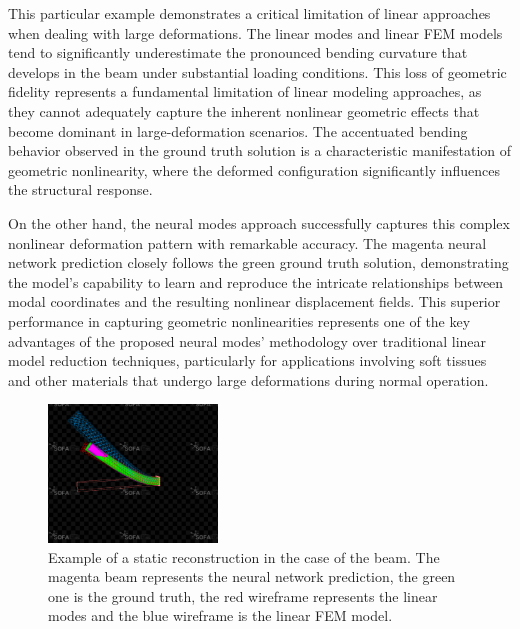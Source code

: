 This particular example demonstrates a critical limitation of linear approaches when dealing with large deformations. The linear modes and linear FEM models tend to significantly underestimate the pronounced bending curvature that develops in the beam under substantial loading conditions. This loss of geometric fidelity represents a fundamental limitation of linear modeling approaches, as they cannot adequately capture the inherent nonlinear geometric effects that become dominant in large-deformation scenarios. The accentuated bending behavior observed in the ground truth solution is a characteristic manifestation of geometric nonlinearity, where the deformed configuration significantly influences the structural response.

On the other hand, the neural modes approach successfully captures this complex nonlinear deformation pattern with remarkable accuracy. The magenta neural network prediction closely follows the green ground truth solution, demonstrating the model's capability to learn and reproduce the intricate relationships between modal coordinates and the resulting nonlinear displacement fields. This superior performance in capturing geometric nonlinearities represents one of the key advantages of the proposed neural modes' methodology over traditional linear model reduction techniques, particularly for applications involving soft tissues and other materials that undergo large deformations during normal operation.

\begin{figure}[H]
    \centering
    \includegraphics[width=0.4\textwidth]{Images/sofa_example_beam.png}
    \caption{Example of a static reconstruction in the case of the beam. The magenta beam represents the neural network prediction, the green one is the ground truth, the red wireframe represents the linear modes and the blue wireframe is the linear FEM model.}
    \label{fig:static_rmse_distribution}
\end{figure}


